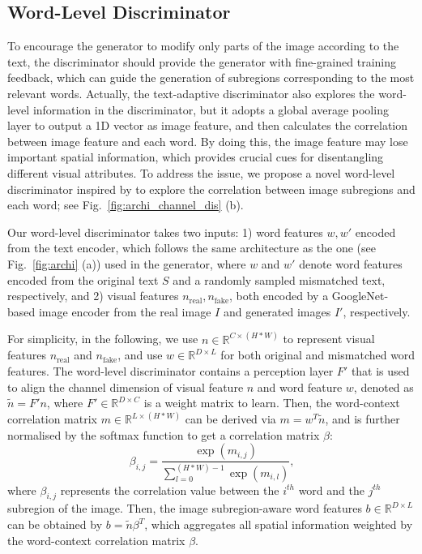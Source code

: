 \documentclass{article}
\begin{document}
\subsection{Word-Level Discriminator}
\label{sec:word}
 
To encourage the generator to modify only parts of the image according to the text, the discriminator should provide the generator with fine-grained training feedback, which can guide the generation of subregions corresponding to the most relevant words.
Actually, the text-adaptive discriminator \cite{nam2018text} also explores the word-level information in the discriminator, but it adopts a global average pooling layer to output a 1D vector as image feature, and then calculates the correlation between image feature and each word. By doing this, the image feature may lose important spatial information, which provides crucial cues for disentangling different visual attributes. 
To address the issue, we propose a novel word-level discriminator inspired by \cite{nam2018text} to explore the correlation between image subregions and each word; see Fig.~\ref{fig:archi_channel_dis} (b).

Our word-level discriminator takes two inputs: 1) word features $w, {w}'$ encoded from the text encoder, which follows the same architecture as the one (see Fig.~\ref{fig:archi} (a)) used in the generator, where $w$ and $w'$ denote word features {encoded from} the original text $S$ and a randomly sampled mismatched text, {respectively}, and 2) visual features $n_\text{real}, n_\text{fake}$, both encoded by a GoogleNet-based \cite{szegedy2015going} image encoder from the real image $I$ and generated images $I'$, respectively. 

For simplicity, in the following, we use $n \in \mathbb{R}^{C \times (H \ast W)}$ to represent visual features $n_\text{real}$ and $n_\text{fake}$, and use $w \in \mathbb{R}^{D \times L}$ for both original and mismatched word features.
The word-level discriminator contains a perception layer $F'$ that is used to align the channel dimension of visual feature $n$ and word feature $w$, denoted as $\tilde{n} = {F'}n$, where ${F}' \in \mathbb{R}^{D \times C}$ is a weight matrix to learn. Then,
the word-context correlation matrix $m \in \mathbb{R}^{L\times (H \ast W)}$ can be derived via $m = w^T\tilde{n}$, and is further normalised by the softmax function to get a correlation matrix $\beta$:
\begin{equation}
\beta _{i,j}=\frac{\exp(m_{i,j})}{\sum^{(H \ast W)-1}_{l=0}\exp(m_{i,l})}
\textrm{,}
\label{eq:correlation}
\end{equation}
where $\beta_{i,j}$ represents the correlation value between the \(i^{th}\) word and the \(j^{th}\) subregion of the image.
Then, the image subregion-aware word features $b \in \mathbb{R}^{D\times L}$ can be obtained by $b = \tilde{n}\beta^T$, which aggregates all spatial information weighted by the word-context correlation matrix $\beta$.
\end{document}
